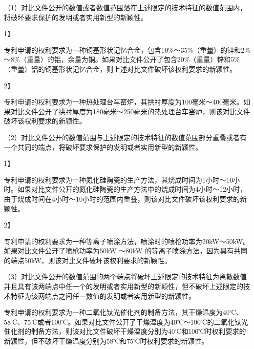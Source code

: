 {\setlength{\parindent}{17.1bp}（1）对比文件公开的数值或者数值范围落在上述限定的技术特征的数值范围内，将破坏要求保护的发明或者实用新型的新颖性。\par}

{1】\par}

专利申请的权利要求为一种铜基形状记忆合金，包含10\%～35\%（重量）的锌和2\%～8\%（重量）的铝，余量为铜。如果对比文件公开了包含20\%（重量）锌和5\%（重量）铝的铜基形状记忆合金，则上述对比文件破坏该权利要求的新颖性。

{2】\par}

专利申请的权利要求为一种热处理台车窑炉，其拱衬厚度为100毫米～400毫米。如果对比文件公开了拱衬厚度为180毫米～250毫米的热处理台车窑炉，则该对比文件破坏该权利要求的新颖性。

{\setlength{\parindent}{17.1bp}（2）对比文件公开的数值范围与上述限定的技术特征的数值范围部分重叠或者有一个共同的端点，将破坏要求保护的发明或者实用新型的新颖性。\par}

{1】\par}

专利申请的权利要求为一种氮化硅陶瓷的生产方法，其烧成时间为1小时～10小时。如果对比文件公开的氮化硅陶瓷的生产方法中的烧成时间为4小时～12小时，由于烧成时间在4小时～10小时的范围内重叠，则该对比文件破坏该权利要求的新颖性。

{2】\par}

专利申请的权利要求为一种等离子喷涂方法，喷涂时的喷枪功率为20kW～50kW。如果对比文件公开了喷枪功率为50kW ～80kW 的等离子喷涂方法，因为具有共同的端点50kW，则该对比文件破坏该权利要求的新颖性。

{\setlength{\parindent}{17.1bp}（3）对比文件公开的数值范围的两个端点将破坏上述限定的技术特征为离散数值并且具有该两端点中任一个的发明或者实用新型的新颖性，但不破坏上述限定的技术特征为该两端点之间任一数值的发明或者实用新型的新颖性。\par}

{\par}

专利申请的权利要求为一种二氧化钛光催化剂的制备方法，其干燥温度为40℃、58℃、75℃或者100℃。如果对比文件公开了干燥温度为40℃～100℃的二氧化钛光催化剂的制备方法，则该对比文件破坏干燥温度分别为40℃和100℃时权利要求的新颖性，但不破坏干燥温度分别为58℃和75℃时权利要求的新颖性。

